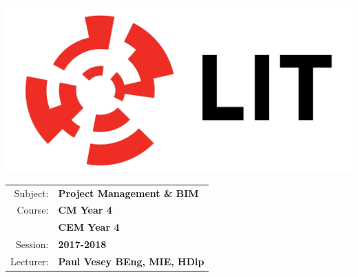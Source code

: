 \documentclass[a4paper, 10pt]{article}
\begin{document}
\lstset{language=HTML,
				basicstyle=\small,
				breaklines=true,
        numbers=left,
        numberstyle=\tiny,
        showstringspaces=false,
        aboveskip=-20pt,
        frame=leftline
        }
				
\begin{table}%
	\begin{minipage}{0.4\textwidth}%
			\includegraphics[width=1\textwidth]{img/LITlogo.jpg}
	\end{minipage}
	\qquad
	\centering
	\parbox{0.4\textwidth}{
		\begin{large}			
			\begin{tabular}{| r | l |} \hline
				Subject: & \textbf{Project Management \& BIM}\\
				Course: & \textbf{CM Year 4}\\
				        & \textbf{CEM Year 4}\\	
				Session: & \textbf{2017-2018}\\
				Lecturer: & \textbf{Paul Vesey \footnotesize{BEng, MIE, HDip}}\\
				\hline
			\end{tabular}
		\end{large}			
	}
\end{table}
\vspace{0.25cm}	
\end{document}
